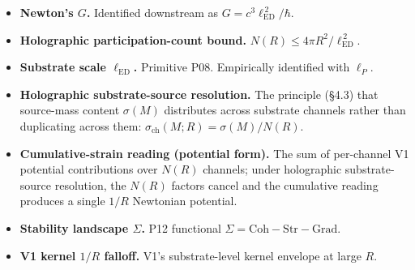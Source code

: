 \documentclass[11pt,a4paper]{article}
\begin{document}
\begin{itemize}[noitemsep]
\item \textbf{Newton's $G$.} Identified downstream as $G = c^3\ell_\mathrm{ED}^{\,2}/\hbar$.
\item \textbf{Holographic participation-count bound.} $N(R) \leq 4\pi R^2/\ell_\mathrm{ED}^{\,2}$.
\item \textbf{Substrate scale $\ell_\mathrm{ED}$.} Primitive P08. Empirically identified with $\ell_P$.
\item \textbf{Holographic substrate-source resolution.} The principle (\S4.3) that source-mass content $\sigma(M)$ distributes across substrate channels rather than duplicating across them: $\sigma_\mathrm{ch}(M; R) = \sigma(M)/N(R)$.
\item \textbf{Cumulative-strain reading (potential form).} The sum of per-channel V1 potential contributions over $N(R)$ channels; under holographic substrate-source resolution, the $N(R)$ factors cancel and the cumulative reading produces a single $1/R$ Newtonian potential.
\item \textbf{Stability landscape $\Sigma$.} P12 functional $\Sigma = \mathrm{Coh} - \mathrm{Str} - \mathrm{Grad}$.
\item \textbf{V1 kernel $1/R$ falloff.} V1's substrate-level kernel envelope at large $R$.
\end{itemize}
\end{document}
